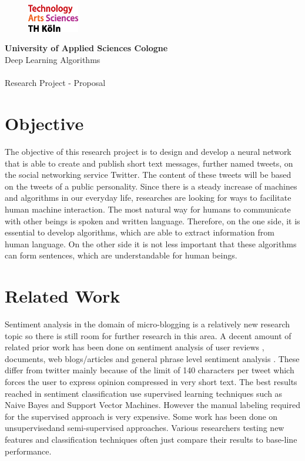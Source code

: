 \documentclass[a4paper,11pt,oneside]{article}
\begin{document}
  \pagestyle{fancy} %
  \fancyhead{}
  \fancyhf{}
  \renewcommand{\headrulewidth}{0pt}
  \renewcommand{\footrulewidth}{0.4pt}
  \fancyfoot[R] {}
  \begin{figure}
    \includegraphics[width=0.2\textwidth]{sources/logo_TH-Koeln_CMYK_22pt}
  \end{figure}
  \Large
  \textbf{University of Applied Sciences Cologne}\\
  Deep Learning Algorithms\\
  \\
  \large
  Research Project - Proposal\\

  \section*{Objective}

The objective of this research project is to design and develop a neural network that is able to create and publish short text messages, further named tweets, on the social networking service Twitter. The content of these tweets will be based on the tweets of a public personality. Since there is a steady increase of machines and algorithms in our everyday life, researches are looking for ways to facilitate human machine interaction. The most natural way for humans to communicate with other beings is spoken and written language. Therefore, on the one side, it is essential to develop algorithms, which are able to extract information from human language. On the other side it is not less important that these algorithms can form sentences, which are understandable for human beings.  
    
  \section*{Related Work}
  
  Sentiment analysis in the domain of micro-blogging is a relatively new research topic so there is still room for further research in this area. A decent amount of related prior work has been done on sentiment analysis of user reviews , documents, web blogs/articles and general phrase level sentiment analysis . These differ from twitter mainly because of the limit of 140 characters per tweet which forces the user to express opinion compressed in very short text. The best results reached in sentiment classification use supervised learning techniques such as Naive Bayes and Support Vector Machines. However the manual labeling required for the supervised approach is very expensive. Some work has been done on unsupervisedand semi-supervised approaches. Various researchers testing new features and classification techniques often just compare their results to base-line performance.
  
\end{document}
